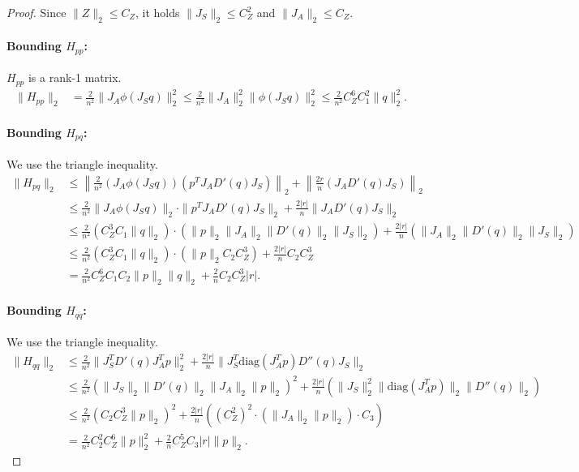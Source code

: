 \documentclass[a4paper,11pt]{article}
\newcommand{\1}{\mathbbm{1}}
\theoremstyle{plain}
\newcommand{\diag}{\mathrm{diag}}
\begin{document}
\begin{proof}
Since $\|Z\|_2 \leq C_Z$, it holds $\|J_S\|_2 \leq C_Z^2$ and $\|J_A\|_2 \leq C_Z$.

\paragraph{Bounding $H_{pp}$:}
$H_{pp}$ is a rank-1 matrix.
\begin{align*}
    \|H_{pp}\|_2 &= \frac{2}{n^2} \|J_A \phi(J_S q)\|_2^2 \leq \frac{2}{n^2} \|J_A\|_2^2 \|\phi(J_S q)\|_2^2
    \leq \frac{2}{n^2} C_Z^6 C_1^2 \|q\|_2^2.
\end{align*}

\paragraph{Bounding $H_{pq}$:}
We use the triangle inequality.
\begin{align*}
    \|H_{pq}\|_2 &\leq \left\| \frac{2}{n^2} (J_A \phi(J_S q)) (p^T J_A D'(q) J_S) \right\|_2 + \left\| \frac{2r}{n} (J_A D'(q) J_S) \right\|_2 \\
    &\leq \frac{2}{n^2} \|J_A \phi(J_S q)\|_2 \cdot \|p^T J_A D'(q) J_S\|_2 + \frac{2|r|}{n} \|J_A D'(q) J_S\|_2 \\
    &\leq \frac{2}{n^2} (C_Z^3 C_1 \|q\|_2) \cdot (\|p\|_2 \|J_A\|_2 \|D'(q)\|_2 \|J_S\|_2) + \frac{2|r|}{n} (\|J_A\|_2 \|D'(q)\|_2 \|J_S\|_2) \\
    &\leq \frac{2}{n^2} (C_Z^3 C_1 \|q\|_2) \cdot (\|p\|_2 C_2 C_Z^3) + \frac{2|r|}{n} C_2 C_Z^3 \\
    &= \frac{2}{n^2} C_Z^6 C_1 C_2 \|p\|_2 \|q\|_2 + \frac{2}{n} C_2 C_Z^3 |r|.
\end{align*}

\paragraph{Bounding $H_{qq}$:}
We use the triangle inequality.
\begin{align*}
    \|H_{qq}\|_2 &\leq \frac{2}{n^2} \|J_S^T D'(q) J_A^T p\|_2^2 + \frac{2|r|}{n} \|J_S^T \diag(J_A^T p) D''(q) J_S\|_2 \\
    &\leq \frac{2}{n^2} (\|J_S\|_2 \|D'(q)\|_2 \|J_A\|_2 \|p\|_2)^2 + \frac{2|r|}{n} (\|J_S\|_2^2 \|\diag(J_A^T p)\|_2 \|D''(q)\|_2) \\
    &\leq \frac{2}{n^2} (C_2 C_Z^3 \|p\|_2)^2 + \frac{2|r|}{n} ( (C_Z^2)^2 \cdot (\|J_A\|_2 \|p\|_2) \cdot C_3 ) \\
    &= \frac{2}{n^2} C_2^2 C_Z^6 \|p\|_2^2 + \frac{2}{n} C_Z^5 C_3 |r| \|p\|_2.
\end{align*}


\end{proof}
\end{document}
